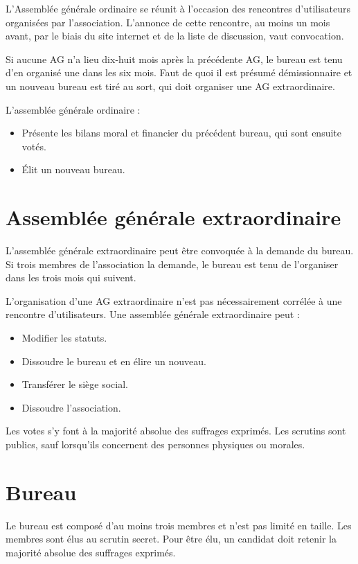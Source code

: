 \documentclass[11pt]{article}
\begin{document}
L'Assemblée générale ordinaire se réunit à l'occasion des rencontres d'utilisateurs organisées par l'association. 
L'annonce de cette rencontre, au moins un mois avant, par le biais du site internet et de la liste de discussion, vaut convocation.

Si aucune AG n'a lieu dix-huit mois après la précédente AG, le bureau est tenu d'en organisé une dans les six mois.
Faut de quoi il est présumé démissionnaire et un nouveau bureau est tiré au sort, qui doit organiser une AG extraordinaire.

L'assemblée générale ordinaire :
\begin{itemize}
	\item Présente les bilans moral et financier du précédent bureau, qui sont ensuite votés.
	\item Élit un nouveau bureau.
\end{itemize}


\section{Assemblée générale extraordinaire}

L'assemblée générale extraordinaire peut être convoquée à la demande du bureau. Si trois membres de l'association la demande, le bureau est tenu de l'organiser dans les trois mois qui suivent.

L'organisation d'une AG extraordinaire n'est pas nécessairement corrélée à une rencontre d'utilisateurs. 
Une assemblée générale extraordinaire peut :
\begin{itemize}
	\item Modifier les statuts.
	\item Dissoudre le bureau et en élire un nouveau.
	\item Transférer le siège social.
	\item Dissoudre l'association.
\end{itemize}

Les votes s'y font à la majorité absolue des suffrages exprimés. Les scrutins sont publics, sauf lorsqu'ils concernent des personnes physiques ou morales.


\section{Bureau}

Le bureau est composé d'au moins trois membres et n'est pas limité en taille. Les membres sont élus au scrutin secret. Pour être élu, un candidat doit retenir la majorité absolue des suffrages exprimés.
\end{document}
